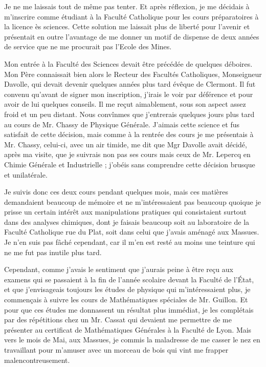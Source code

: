 \documentclass[11pt,a4paper]{report}
\begin{document}
Je ne me laissais tout de même pas tenter. Et après réflexion, je me décidais à m'inscrire comme étudiant à la Faculté Catholique pour les cours préparatoires à la licence ès sciences. Cette solution me laissait plus de liberté pour l'avenir et présentait en outre l'avantage de me donner un motif de dispense de deux années de service que ne me procurait pas l'Ecole des Mines.

Mon entrée à la Faculté des Sciences devait être précédée de quelques déboires. Mon Père connaissait bien alors le Recteur des Facultés Catholiques, Monseigneur Davolle, qui devait devenir quelques années plus tard évêque de Clermont. Il fut convenu qu'avant de signer mon inscription, j'irais le voir par déférence et pour avoir de lui quelques conseils. Il me reçut aimablement, sous son aspect assez froid et un peu distant. Nous convînmes que j'entrerais quelques jours plus tard au cours de Mr. Chassy de Physique Générale. J'aimais cette science et fus satisfait de cette décision, mais comme à la rentrée des cours je me présentais à Mr. Chassy, celui-ci, avec un air timide, me dit que Mgr Davolle avait décidé, après ma visite, que je suivrais non pas ses cours mais ceux de Mr. Lepercq en Chimie Générale et Industrielle ; j'obéis sans comprendre cette décision brusque et unilatérale.

Je suivis donc ces deux cours pendant quelques mois, mais ces matières demandaient beaucoup de mémoire et ne m'intéressaient pas beaucoup quoique je prisse un certain intérêt aux manipulations pratiques qui consistaient surtout dans des analyses chimiques, dont je faisais beaucoup soit au laboratoire de la Faculté Catholique rue du Plat, soit dans celui que j'avais aménagé aux Massues. Je n'en suis pas fâché cependant, car il m'en est resté au moins une teinture qui ne me fut pas inutile plus tard.

Cependant, comme j'avais le sentiment que j'aurais peine à être reçu aux examens qui se passaient à la fin de l'année scolaire devant la Faculté de l'État, et que j'envisageais toujours les études de physique qui m'intéressaient plus, je commençais à suivre les cours de Mathématiques spéciales de Mr. Guillon. Et pour que ces études me donnassent un résultat plus immédiat, je les complétais par des répétitions chez un Mr. Cassat qui devaient me permettre de me présenter au certificat de Mathématiques Générales à la Faculté de Lyon. Mais vers le mois de Mai, aux Massues, je commis la maladresse de me casser le nez en travaillant pour m'amuser avec un morceau de bois qui vint me frapper malencontreusement.
\end{document}
